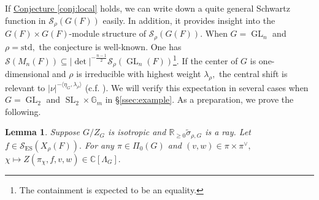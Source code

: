 \documentclass[10pt]{amsart}
\newtheorem{lemma}[theorem]{Lemma}
\theoremstyle{definition}
\numberwithin{equation}{section}
\DeclareMathOperator{\GL}{\mathrm{GL}}
\DeclareMathOperator{\SL}{\mathrm{SL}}
\numberwithin{equation}{subsection}
\newcommand{\RR}{\mathbb{R}}
\newcommand{\CC}{\mathbb{C}}
\newcommand{\GG}{\mathbb{G}}
\begin{document}
\noindent 
If \hyperref[conj:local]{Conjecture \ref{conj:local}} holds, we can write down a quite general Schwartz function in $\mathcal{S}_\rho(G(F))$ easily. In addition, it provides insight into the $G(F)\times G(F)$-module structure of $\mathcal{S}_\rho(G(F)).$ When $G=\GL_n$ and $\rho=\mathrm{std},$ the conjecture is well-known. One has $\mathcal{S}(M_{n}(F))\subseteq|\det|^{-\frac{n-1}{2}}\mathcal{S}_\rho(\GL_n(F))$\footnote{The containment is expected to be an equality.}. If the center of $G$ is one-dimensional and $\rho$ is irreducible with highest weight $\lambda_\rho,$ the central shift is relevant to $|\nu|^{-\langle \eta_G,\lambda_\rho\rangle}$ (c.f. \cite[\S 4.2]{Ngo:Hankel}). We will verify this expectation in several cases when $G=\GL_2$ and $\SL_2\times \GG_m$ in \S \ref{ssec:example}. As a preparation, we prove the following.

\begin{lemma}\label{lem:cuspidalhol}
    Suppose $G/Z_G$ is isotropic and $\RR_{\ge 0}\widetilde{\sigma}_{\rho,G}$ is a ray. Let $f\in \mathcal{S}_{\mathrm{ES}}(X_\rho(F)).$ For any $\pi\in \Pi_0(G)$ and $(v,w)\in\pi\times \pi^\lor,$ $\chi\mapsto Z(\pi_\chi,f,v,w)\in \CC[\Lambda_G].$ 
\end{lemma}
\end{document}
